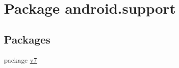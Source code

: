 \hypertarget{namespaceandroid_1_1support}{}\section{Package android.\+support}
\label{namespaceandroid_1_1support}
\subsection*{Packages}
\begin{DoxyCompactItemize}
\item 
package \hyperlink{namespaceandroid_1_1support_1_1v7}{v7}
\end{DoxyCompactItemize}

